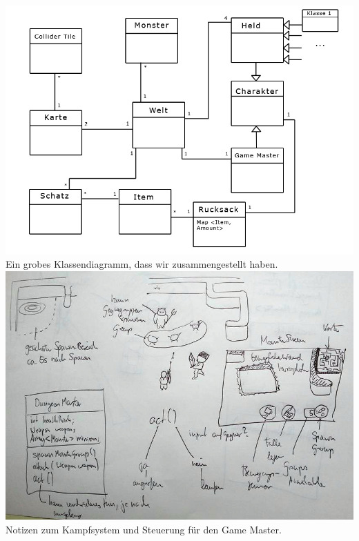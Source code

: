 \documentclass[10pt,a4paper,notitlepage]{report}
\begin{document}
\begin{flushleft}
	\begin{center}
		\includegraphics[scale=0.5]{Class-Diagram.jpg}\\
		Ein grobes Klassendiagramm, dass wir zusammengestellt haben.
		\includegraphics[scale=0.5]{scetch_01.jpg}
		Notizen zum Kampfsystem und Steuerung für den Game Master.
	\end{center}
	
\end{flushleft}
\end{document}
